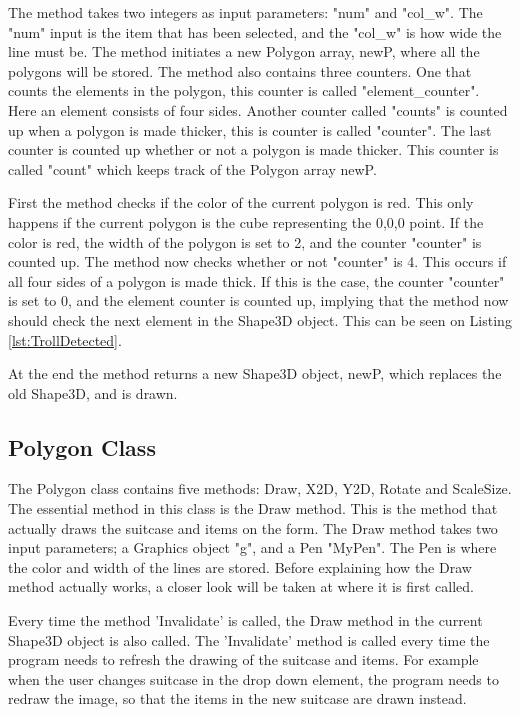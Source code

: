 The method takes two integers as input parameters: "num" and "col\_w". The "num" input is the item that has been selected, and the "col\_w" is how wide the line must be. The method initiates a new Polygon array, newP, where all the polygons will be stored. The method also contains three counters. One that counts the elements in the polygon, this counter is called "element\_counter". Here an element consists of four sides. Another counter called "counts" is counted up when a polygon is made thicker, this is counter is called "counter". The last counter is counted up whether or not a polygon is made thicker. This counter is called "count" which keeps track of the Polygon array newP.

First the method checks if the color of the current polygon is red. This only happens if the current polygon is the cube representing the 0,0,0 point. If the color is red, the width of the polygon is set to 2, and the counter "counter" is counted up. The method now checks whether or not "counter" is 4. This occurs if all four sides of a polygon is made thick. If this is the case, the counter "counter" is set to 0, and the element counter is counted up, implying that the method now should check the next element in the Shape3D object. This can be seen on Listing \ref{lst:TrollDetected}.


At the end the method returns a new Shape3D object, newP, which replaces the old Shape3D, and is drawn.

\subsection{Polygon Class} 
The Polygon class contains five methods: Draw, X2D, Y2D, Rotate and ScaleSize. The essential method in this class is the Draw method. This is the method that actually draws the suitcase and items on the form. The Draw method takes two input parameters; a Graphics object "g", and a Pen "MyPen". The Pen is where the color and width of the lines are stored. Before explaining how the Draw method actually works, a closer look will be taken at where it is first called.

Every time the method 'Invalidate' is called, the Draw method in the current Shape3D object is also called. The 'Invalidate' method is called every time the program needs to refresh the drawing of the suitcase and items. For example when the user changes suitcase in the drop down element, the program needs to redraw the image, so that the items in the new suitcase are drawn instead. 

